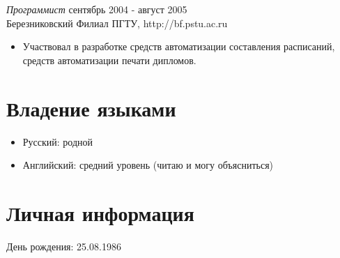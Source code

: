 \documentclass[12pt]{res} %
\begin{document}
\begin{resume}
{\sl Программист} \hfill сентябрь 2004 - август 2005 \\
Березниковский Филиал ПГТУ, http://bf.pstu.ac.ru
\begin{itemize}
\item Участвовал в разработке средств автоматизации составления расписаний, средств автоматизации печати дипломов.
\end{itemize} 

\section{Владение языками}
\begin{itemize}
\item Русский: родной
\item Английский: средний уровень (читаю и могу объясниться)
\end{itemize}

\section{Личная информация}
День рождения: 25.08.1986

\end{resume}
\end{document}
